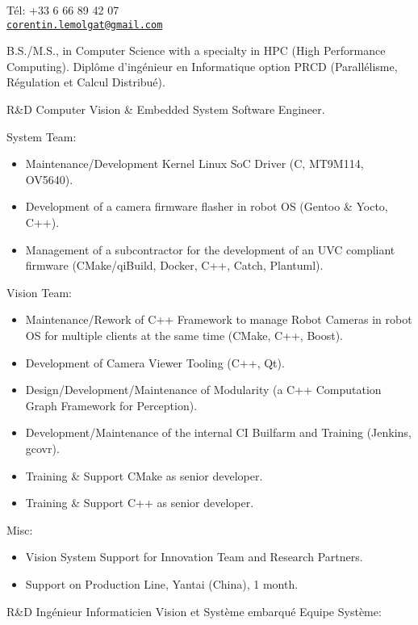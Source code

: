\documentclass{article}
\begin{document}


T\'{e}l: +33 6 66 89 42 07\\
\href{mailto:corentin.lemolgat@gmail.com}{\texttt{corentin.lemolgat@gmail.com}}\\

\begin{llist}
 
 {
B.S./M.S., in Computer Science with a specialty in HPC (High Performance Computing).
} {
Dipl\^{o}me d'ing\'{e}nieur en Informatique option PRCD (Parall\'{e}lisme,
R\'{e}gulation et Calcul Distribu\'{e}).
}

{}
{}
\vspace{-0.33cm}

 {
R\&D Computer Vision \& Embedded System Software Engineer.\\
\vspace{-0.33cm}

System Team:
\begin{itemize}
\item Maintenance/Development Kernel Linux SoC Driver (C, MT9M114, OV5640).
\item Development of a camera firmware flasher in robot OS (Gentoo \& Yocto, C++).
\item Management of a subcontractor for the development of an UVC compliant firmware (CMake/qiBuild, Docker, C++, Catch, Plantuml).
\end{itemize}
Vision Team:
\begin{itemize}
\item Maintenance/Rework of C++ Framework to manage Robot Cameras in robot OS for multiple clients at the same time (CMake, C++, Boost).
\item Development of Camera Viewer Tooling (C++, Qt).
\item Design/Development/Maintenance of Modularity (a C++ Computation Graph Framework for Perception).
\item Development/Maintenance of the internal CI Builfarm and Training (Jenkins,
 gcovr).
\item Training \& Support CMake as senior developer.
\item Training \& Support C++ as senior developer.
\end{itemize}
Misc:
\begin{itemize}
\item Vision System Support for Innovation Team and Research Partners.
\item Support on Production Line, Yantai (China), 1 month.
\end{itemize}
}{
R\&D Ing\'{e}nieur Informaticien Vision et Syst\`{e}me embarqu\'{e}
\vspace{-0.33cm}
Equipe Syst\`{e}me:

}
\end{llist}
\end{document}
